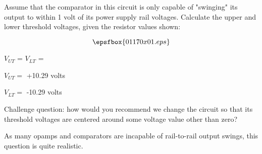 

Assume that the comparator in this circuit is only capable of "swinging" its output to within 1 volt of its power supply rail voltages.  Calculate the upper and lower threshold voltages, given the resistor values shown:

$$\epsfbox{01170x01.eps}$$

$V_{UT}$ = \hskip 80pt $V_{LT}$ = 

\vskip 10pt







$V_{UT} =$ +10.29 volts

\vskip 10pt

$V_{LT} =$ -10.29 volts

\vskip 10pt

Challenge question: how would you recommend we change the circuit so that its threshold voltages are centered around some voltage value other than zero?







As many opamps and comparators are incapable of rail-to-rail output swings, this question is quite realistic.




